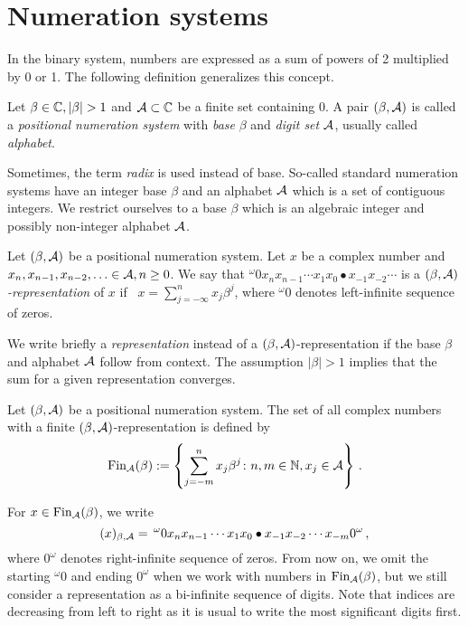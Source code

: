 
\section{Numeration systems}
In the binary system, numbers are expressed as a sum of powers of 2 multiplied by 0 or 1. The following definition generalizes this concept.
\begin{defn}
  Let $\beta \in \CC, |\beta|>1$ and $\mathcal{A} \subset \mathbb{C}$ be a finite set containing 0. A pair $(\beta, \mathcal{A})$ is called a \emph{positional numeration system} with \emph{base} $\beta$ and \emph{digit set} $\mathcal{A}$, usually called \emph{alphabet}.
\end{defn}
Sometimes, the term \emph{radix} is used instead of base. So-called standard numeration systems have an integer base $\beta$ and an alphabet $\mathcal{A}$ which is a set of contiguous integers. We restrict ourselves to a base $\beta$ which is an algebraic integer and possibly non-integer alphabet $\mathcal{A}$. 

\begin{defn}
Let $(\beta, \mathcal{A})$ be a positional numeration system. Let $x$ be a complex number and $x_n,x_{n-1}, x_{n-2},\ldots \in\mathcal{A}, n\geq 0$. We say that $^\omega0 x_n x_{n-1}\cdots x_1 x_0 \bullet x_{-1} x_{-2} \cdots $ is a \emph{$(\beta, \mathcal{A})$-representation} of $x$ if~  $x=\sum_{j=-\infty}^n x_j \beta^j$, where $^\omega0$  denotes left-infinite sequence of zeros.
\end{defn}
 We write briefly a \emph{representation} instead of a $(\beta, \mathcal{A})$-representation if the base $\beta$ and alphabet $\mathcal{A}$ follow from context. The assumption $|\beta|>1$ implies that the sum for a given representation converges.

\begin{defn}
Let $(\beta, \mathcal{A})$ be a positional numeration system. The set of all complex numbers with a finite $(\beta, \mathcal{A})$-representation is defined by
$$
    \text{Fin}_{\mathcal{A}}(\beta):=\left\{\sum_{j=-m}^n x_j \beta^j\colon n, m \in \mathbb{N}, x_j \in \mathcal{A} \right\}\,.
$$
\end{defn}
   
For  $x\in\text{Fin}_{\mathcal{A}}(\beta)$, we write 
$$
(x)_{\beta,\mathcal{A}}=\,  ^\omega0 x_n x_{n-1}\cdots x_1 x_0 \bullet x_{-1} x_{-2} \cdots x_{-m} 0^\omega\,,
$$ 
where $0^\omega$ denotes right-infinite sequence of zeros. From now on, we omit the starting $^\omega0$ and ending $0^\omega$ when we work with numbers in $\text{Fin}_{\mathcal{A}}(\beta)$, but we still consider a representation as a bi-infinite sequence of digits. Note that indices are decreasing from left to right as it is usual to write the most significant digits first. 

